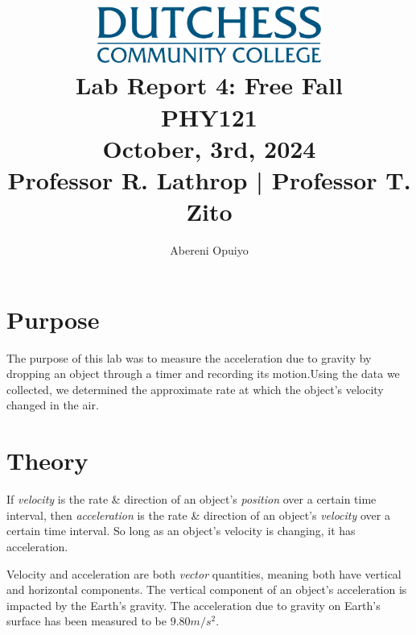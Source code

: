 \documentclass[a4paper,12pt]{article}
\title{
    \vspace{5cm} %
    \includegraphics[width=0.55\textwidth]{dutchess-logo-blue.png} \\ %
    \vspace{1cm} %
    \textbf{\Huge Lab Report 4: Free Fall} \\
    \vspace{1cm} %
    \large PHY121 \\
    \vspace{0.5cm} %
    \large	October, 3rd, 2024 \\ 
		\vspace{.5cm}
		\large Professor R. Lathrop | Professor T. Zito
}
\author{Abereni Opuiyo}
\date{}
\begin{document}
\maketitle
	\thispagestyle{plain}
\newpage




\setcounter{secnumdepth}{0}
\setcounter{page}{1}  %
\tableofcontents
\thispagestyle{fancy}
\newpage




\section{Purpose}
\vspace{-0.5cm}
\singlespacing
The purpose of this lab was to measure the acceleration due to gravity by dropping an object through a timer and recording its motion.Using the data we collected, we determined the approximate rate at which the object's velocity changed in the air.




\section{Theory}
\vspace{-0.5cm}
\singlespacing

\indent If \textit{velocity} is the rate \& direction of an object's \textit{position} over a certain time interval, then \textit{acceleration} is the rate \& direction of an object's \textit{velocity} over a certain time interval. So long as an object's velocity is changing, it has acceleration.\par 


Velocity and acceleration are both \textit{vector} quantities, meaning both have vertical and horizontal components. The vertical component of an object's acceleration is impacted by the Earth's gravity. The acceleration due to gravity on Earth's surface has been measured to be \textit{$9.80 {m/s^2}$}. \par
\end{document}
